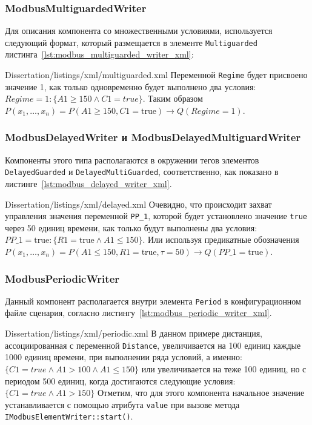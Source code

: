 \subsubsection{ModbusMultiguardedWriter}
Для описания компонента со множественными условиями, используется следующий формат,
который размещается в элементе \texttt{Multiguarded} листинга~\ref{lst:modbus_multiguarded_writer_xml}:

        {Dissertation/listings/xml/multiguarded.xml}
Переменной \texttt{Regime} будет присвоено значение 1, как только 
одновременно будет выполнено два условия: $Regime = 1: \{A1 \ge 150 \wedge C1 = true\}$.
Таким образом $P(x_1,\ldots,x_n) = P(A1\ge150, C1=\mbox{true}) \to Q(Regime=1)$.

\subsubsection{ModbusDelayedWriter и ModbusDelayedMultiguardWriter}
Компоненты этого типа располагаются в окружении тегов элементов \texttt{DelayedGuarded} и \texttt{DelayedMultiGuarded}, соответственно,
как показано в листинге~\ref{lst:modbus_delayed_writer_xml}.

        {Dissertation/listings/xml/delayed.xml}
Очевидно, что происходит захват управления значения переменной \texttt{PP\_1}, которой будет установлено значение \texttt{true}
через 50 единиц времени, как только будут выполнены два условия:
$PP\_1 = \mbox{true}: \{R1 = \mbox{true} \wedge A1 \le 150\}$.
Или используя предикатные обозначения
$P(x_1,\ldots,x_n) = P(A1\le150, R1=\mbox{true}, \tau=50) \to Q(PP\_1=\mbox{true})$.


\subsubsection{ModbusPeriodicWriter}
Данный компонент располагается внутри элемента \texttt{Period} в конфигурационном файле сценария,
согласно листингу~\ref{lst:modbus_periodic_writer_xml}.

        {Dissertation/listings/xml/periodic.xml}
В данном примере дистанция, ассоциированная с переменной \texttt{Distance}, увеличивается на 100 единиц каждые 1000 единиц времени,
при выполнении ряда условий, а именно: $\{C1 = true \wedge A1 > 100 \wedge A1 \le 150 \}$ или
увеличивается на теже 100 единиц, но с периодом 500 единиц, когда достигаются следующие условия:
$\{C1 = true \wedge A1 > 150\}$
Отметим, что для этого компонента начальное значение устанавливается с помощью атрибута \texttt{value}
при вызове метода \texttt{IModbusElementWriter::start()}.


